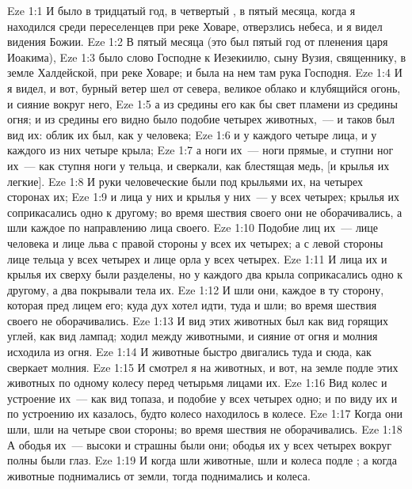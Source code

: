 \vs Eze 1:1 И было в тридцатый год, в четвертый , в пятый  месяца, когда я находился среди переселенцев при реке Ховаре, отверзлись небеса, и я видел видения Божии.
\vs Eze 1:2 В пятый  месяца (это был пятый год от пленения царя Иоакима),
\vs Eze 1:3 было слово Господне к Иезекиилю, сыну Вузия, священнику, в земле Халдейской, при реке Ховаре; и была на нем там рука Господня.
\rsbpar\vs Eze 1:4 И я видел, и вот, бурный ветер шел от севера, великое облако и клубящийся огонь, и сияние вокруг него,
\vs Eze 1:5 а из средины его как бы свет пламени из средины огня; и из средины его видно было подобие четырех животных,~--- и таков был вид их: облик их был, как у человека;
\vs Eze 1:6 и у каждого четыре лица, и у каждого из них четыре крыла;
\vs Eze 1:7 а ноги их~--- ноги прямые, и ступни ног их~--- как ступня ноги у тельца, и сверкали, как блестящая медь, [и крылья их легкие].
\vs Eze 1:8 И руки человеческие были под крыльями их, на четырех сторонах их;
\vs Eze 1:9 и лица у них и крылья у них~--- у всех четырех; крылья их соприкасались одно к другому; во время шествия своего они не оборачивались, а шли каждое по направлению лица своего.
\vs Eze 1:10 Подобие лиц их~--- лице человека и лице льва с правой стороны у всех их четырех; а с левой стороны лице тельца у всех четырех и лице орла у всех четырех.
\vs Eze 1:11 И лица их и крылья их сверху были разделены, но у каждого два крыла соприкасались одно к другому, а два покрывали тела их.
\vs Eze 1:12 И шли они, каждое в ту сторону, которая пред лицем его; куда дух хотел идти, туда и шли; во время шествия своего не оборачивались.
\vs Eze 1:13 И вид этих животных был как вид горящих углей, как вид лампад;  ходил между животными, и сияние от огня и молния исходила из огня.
\vs Eze 1:14 И животные быстро двигались туда и сюда, как сверкает молния.
\vs Eze 1:15 И смотрел я на животных, и вот, на земле подле этих животных по одному колесу перед четырьмя лицами их.
\vs Eze 1:16 Вид колес и устроение их~--- как вид топаза, и подобие у всех четырех одно; и по виду их и по устроению их казалось, будто колесо находилось в колесе.
\vs Eze 1:17 Когда они шли, шли на четыре свои стороны; во время шествия не оборачивались.
\vs Eze 1:18 А ободья их~--- высоки и страшны были они; ободья их у всех четырех вокруг полны были глаз.
\vs Eze 1:19 И когда шли животные, шли и колеса подле ; а когда животные поднимались от земли, тогда поднимались и колеса.
